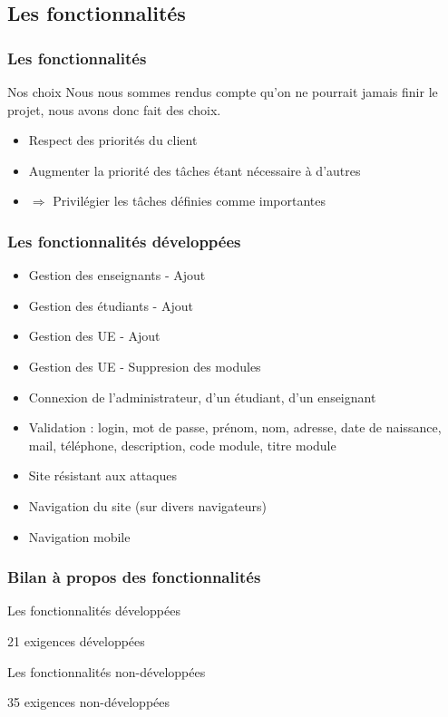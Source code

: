 \documentclass{beamer}
\begin{document}
    \subsection{Les fonctionnalités}
    \begin{frame}
      \frametitle{Les fonctionnalités}
      \begin{block}{Nos choix}
        Nous nous sommes rendus compte qu'on ne pourrait jamais finir le projet, nous avons donc fait des choix.
        \begin{itemize}
          \item Respect des priorités du client
          \item Augmenter la priorité des tâches étant nécessaire à d'autres
          \item $ \Rightarrow $ Privilégier les tâches définies comme importantes
        \end{itemize}
      \end{block}    
    \end{frame}
    \begin{frame}
      \frametitle{Les fonctionnalités développées}
      \begin{block}{}
        \begin{itemize}
          \item Gestion des enseignants - Ajout
          \item Gestion des étudiants - Ajout
          \item Gestion des UE - Ajout
          \item Gestion des UE - Suppresion des modules
          \item Connexion de l'administrateur, d'un étudiant, d'un enseignant
          \item Validation : login, mot de passe, prénom, nom, adresse, date de naissance, mail, téléphone, description, code module, titre module
          \item Site résistant aux attaques
          \item Navigation du site (sur divers navigateurs)
          \item Navigation mobile
        \end{itemize}
      \end{block}
    \end{frame}
    \begin{frame}
      \frametitle{Bilan à propos des fonctionnalités}
      \begin{block}{Les fonctionnalités développées}
        \begin{center}
          21 exigences développées
        \end{center}
      \end{block}
      \begin{block}{Les fonctionnalités non-développées}
        \begin{center}
          35 exigences non-développées
        \end{center}
      \end{block}
    \end{frame}
\end{document}
